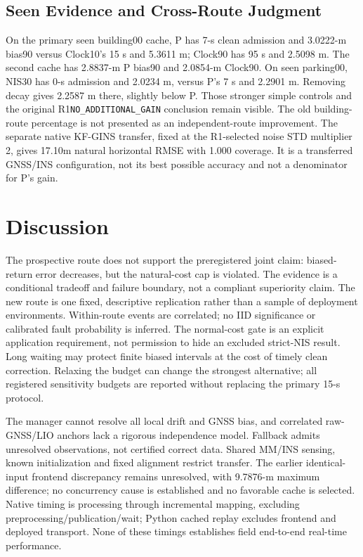 \documentclass[conference]{IEEEtran}
\begin{document}
\subsection{Seen Evidence and Cross-Route Judgment}
On the primary seen building00 cache, P has 7-s clean admission and 3.0222-m bias90 versus Clock10's 15 s and 5.3611 m; Clock90 has 95 s and 2.5098 m. The second cache has 2.8837-m P bias90 and 2.0854-m Clock90. On seen parking00, NIS30 has 0-s admission and 2.0234 m, versus P's 7 s and 2.2901 m. Removing decay gives 2.2587 m there, slightly below P. Those stronger simple controls and the original R1\texttt{NO\_ADDITIONAL\_GAIN} conclusion remain visible. The old building-route percentage is not presented as an independent-route improvement. The separate native KF-GINS transfer, fixed at the R1-selected noise STD multiplier 2, gives 17.10m natural horizontal RMSE with 1.000 coverage. It is a transferred GNSS/INS configuration, not its best possible accuracy and not a denominator for P's gain.

\section{Discussion}
The prospective route does not support the preregistered joint claim: biased-return error decreases, but the natural-cost cap is violated. The evidence is a conditional tradeoff and failure boundary, not a compliant superiority claim. The new route is one fixed, descriptive replication rather than a sample of deployment environments. Within-route events are correlated; no IID significance or calibrated fault probability is inferred. The normal-cost gate is an explicit application requirement, not permission to hide an excluded strict-NIS result. Long waiting may protect finite biased intervals at the cost of timely clean correction. Relaxing the budget can change the strongest alternative; all registered sensitivity budgets are reported without replacing the primary 15-s protocol.

The manager cannot resolve all local drift and GNSS bias, and correlated raw-GNSS/LIO anchors lack a rigorous independence model. Fallback admits unresolved observations, not certified correct data. Shared MM/INS sensing, known initialization and fixed alignment restrict transfer. The earlier identical-input frontend discrepancy remains unresolved, with 9.7876-m maximum difference; no concurrency cause is established and no favorable cache is selected. Native timing is processing through incremental mapping, excluding preprocessing/publication/wait; Python cached replay excludes frontend and deployed transport. None of these timings establishes field end-to-end real-time performance.
\end{document}
